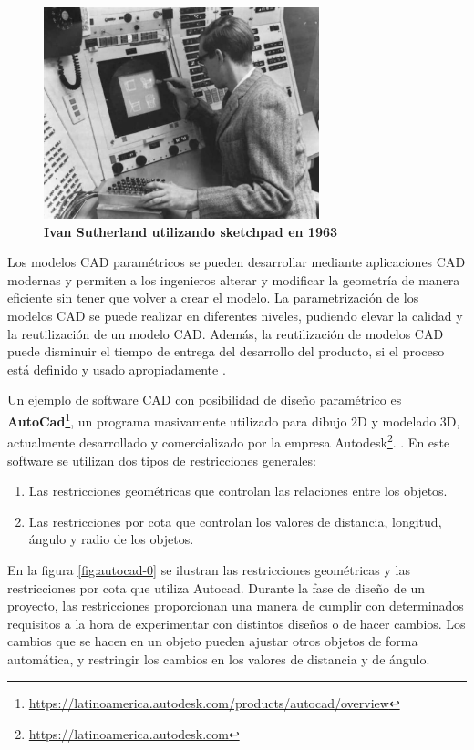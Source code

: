 \begin{figure}[h]
\includegraphics[width=8cm]{Img/GEO/geo-sketchpadc.jpg}
\centering
\caption{\textbf{\footnotesize{Ivan Sutherland utilizando sketchpad en 1963}}}
\label{img:sketchpad}
\end{figure}

Los modelos CAD paramétricos se pueden desarrollar mediante aplicaciones CAD modernas y permiten a los ingenieros alterar y modificar la geometría de manera eficiente sin tener que volver a crear el modelo.
La parametrización de los modelos CAD se puede realizar en diferentes niveles, pudiendo elevar la calidad y la reutilización de un modelo CAD.
Además, la reutilización de modelos CAD puede disminuir el tiempo de entrega del desarrollo del producto, si el proceso está definido y usado apropiadamente \citep{Alfaiate2017}.


Un ejemplo de software CAD con posibilidad de diseño paramétrico es \textbf{AutoCad}\footnote{\url{https://latinoamerica.autodesk.com/products/autocad/overview}}, un programa masivamente utilizado para dibujo 2D y modelado 3D, actualmente desarrollado y comercializado por la empresa Autodesk\footnote{\url{https://latinoamerica.autodesk.com}}.  \citep{Autodesk2017}. En este software se utilizan dos tipos de restricciones generales:
\begin{enumerate}
    \item Las restricciones geométricas que controlan las relaciones entre los objetos. 
    \item Las restricciones por cota que controlan los valores de distancia, longitud, ángulo y radio de los objetos.
\end{enumerate}

En la figura \ref{fig:autocad-0} se ilustran las restricciones geométricas y las restricciones por cota que utiliza Autocad. Durante la fase de diseño de un proyecto, las restricciones proporcionan una manera de cumplir con determinados requisitos a la hora de experimentar con distintos diseños o de hacer cambios. Los cambios que se hacen en un objeto pueden ajustar otros objetos de forma automática, y restringir los cambios en los valores de distancia y de ángulo.

